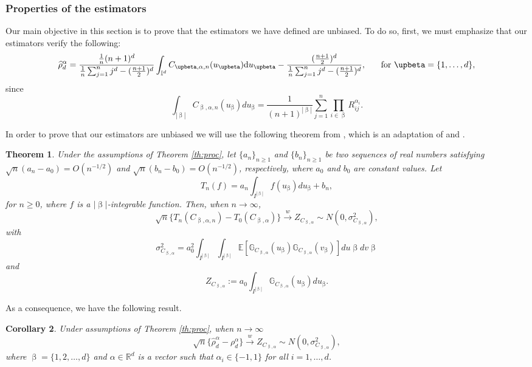 \documentclass[11pt,a4paper]{article}
\newtheorem{theorem}{Theorem}
\newtheorem{corollary}[theorem]{Corollary}
\begin{document}
\subsubsection{Properties of the estimators}\label{sect:prop}
Our main objective in this section is to prove that the estimators we have defined are unbiased. To do so, first, we must emphasize that our estimators verify the following:
\begin{equation}\label{eq:concl}
    \widehat{\rho}_d^\alpha=\frac{\frac{1}{n}(n+1)^d}{\frac{1}{n}\sum_{j=1}^nj^d-(\frac{n+1}{2})^d}\int_{\mathbb{I}^d}C_{\upbeta,\alpha,n}(u_\upbeta){\rm d}u_\upbeta-\frac{(\frac{n+1}{2})^d}{\frac{1}{n}\sum_{j=1}^nj^d-(\frac{n+1}{2})^d}, \hspace{0.5cm}\text{ for }\upbeta=\{1,\ldots,d\},
\end{equation}
since $$\int_{|\upbeta|}C_{\upbeta,\alpha,n}(u_\upbeta)du_\upbeta=\frac{1}{(n+1)^{|\upbeta|}}\sum_{j=1}^n\prod_{i\in\upbeta}R_{ij}^{\alpha_i}.$$

In order to prove that our estimators are unbiased we will use the following theorem from \cite{Gar2013}, which is an adaptation of \cite[Theorem 6]{Fer2004} and \cite{Gan87}.

\begin{theorem}\label{th:proc2}
    Under the assumptions of Theorem \ref{th:proc}, let  $\{a_n\}_{n\geq 1}$ and $\{b_n\}_{n\geq 1}$ be two sequences of real numbers satisfying $\sqrt{n}(a_n-a_0)=O(n^{-1/2})$ and $\sqrt{n}(b_n-b_0)=O(n^{-1/2})$, respectively, where $a_0$ and $b_0$ are constant values. Let $$T_n(f)=a_n\int_{I^{|\upbeta|}}f(u_\upbeta)du_\upbeta+b_n,$$
    for $n\geq 0$, where $f$ is a $|\upbeta|$-integrable function. Then, when $n\longrightarrow\infty$,
    $$\sqrt{n}\{T_n(C_{\upbeta,\alpha,n})-T_0(C_{\upbeta,\alpha})\}\xrightarrow{w}Z_{C_{\upbeta,\alpha}}\sim N(0,\sigma_{C_{\upbeta,\alpha}}^2),$$
    with $$\sigma_{C_{\upbeta,\alpha}}^2=a_0^2\int_{I^{|\upbeta|}}\int_{I^{|\upbeta|}}\mathbb{E}[\mathbb{G}_{C_{\upbeta,\alpha}}(u_\upbeta)\mathbb{G}_{C_{\upbeta,\alpha}}(v_\upbeta)]du\upbeta dv\upbeta$$ and $$Z_{C_{\upbeta,\alpha}}:=a_0\int_{I^{|\upbeta|}}\mathbb{G}_{C_{\upbeta,\alpha}}(u_\upbeta)du_\upbeta.$$
\end{theorem}

As a consequence, we have the following result.

\begin{corollary}\label{col:unb}
    Under assumptions of Theorem \ref{th:proc}, when $n\longrightarrow\infty$
    $$\sqrt{n}\{\widehat{\rho}_d^\alpha-\rho_d^\alpha\}\xrightarrow{w}Z_{C_{\upbeta,\alpha}}\sim N(0,\sigma_{C_{\upbeta,\alpha}}^2),$$
    where $\upbeta=\{1,2,\ldots,d\}$ and $\alpha\in\mathbb{R}^d$ is a vector such that $\alpha_i\in\{-1,1\}$ for all $i=1,\ldots,d$.
\end{corollary}
\end{document}

